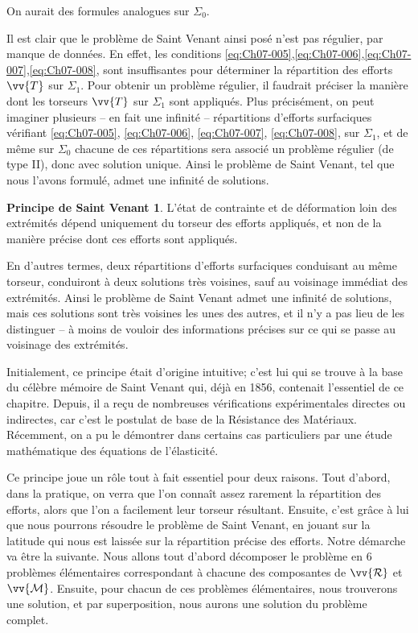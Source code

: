 On aurait des formules analogues sur $\Sigma_0$.

Il est clair que le problème de Saint Venant ainsi posé n'est pas régulier, par manque de données.
En effet, les conditions \eqref{eq:Ch07-005},\eqref{eq:Ch07-006},\eqref{eq:Ch07-007},\eqref{eq:Ch07-008}, sont insuffisantes pour déterminer la répartition des efforts $\vv{T}$ sur $\Sigma_1$.
Pour obtenir un problème régulier, il faudrait préciser la manière dont les torseurs $\vv{T}$ sur $\Sigma_1$ sont appliqués.
Plus précisément, on peut imaginer plusieurs --	en fait une infinité -- répartitions d'efforts surfaciques vérifiant \eqref{eq:Ch07-005}, \eqref{eq:Ch07-006}, \eqref{eq:Ch07-007}, \eqref{eq:Ch07-008}, sur $\Sigma_1$, et de même sur $\Sigma_0$ chacune de ces répartitions sera associé un problème régulier (de type II), donc avec solution unique.
Ainsi le problème de Saint Venant, tel que nous l'avons formulé, admet une infinité de solutions.

\theoremstyle{definition}
\newtheorem*{psv}{Principe de Saint Venant}
\begin{psv}
    L'état de contrainte et de déformation loin des extrémités dépend uniquement du torseur des efforts appliqués, et non de la manière précise dont ces efforts sont appliqués.
\end{psv}

En d'autres termes, deux répartitions d'efforts surfaciques conduisant au même torseur, conduiront à deux solutions très voisines, sauf au voisinage immédiat des extrémités.
Ainsi le problème de Saint Venant admet une infinité de solutions, mais ces solutions sont très voisines les unes des autres, et il n'y a pas lieu de les distinguer -- à moins de vouloir des informations précises sur ce qui se passe au voisinage des extrémités.

Initialement, ce principe était d'origine intuitive; c'est lui qui se trouve à la base du célèbre mémoire de Saint Venant qui, déjà en 1856, contenait l'essentiel de ce chapitre.
Depuis, il a reçu de nombreuses vérifications expérimentales directes ou indirectes, car c'est le postulat de base de la Résistance des Matériaux.
Récemment, on a pu le démontrer dans certains cas particuliers par une étude mathématique des équations de l'élasticité.

Ce principe joue un rôle tout à fait essentiel pour deux raisons.
Tout d'abord, dans la pratique, on verra que l'on connaît assez rarement la répartition des efforts, alors que l'on a facilement leur torseur résultant.
Ensuite, c'est grâce à lui que nous pourrons résoudre le problème de Saint Venant, en jouant sur la latitude qui nous est laissée sur la répartition précise des efforts.
Notre démarche va être la suivante.
Nous allons tout d'abord décomposer le problème en 6 problèmes élémentaires correspondant à chacune des composantes de $\vv{\mathcal{R}}$ et $\vv{\mathcal{M}}$.
Ensuite, pour chacun de ces problèmes élémentaires, nous trouverons une solution, et par superposition, nous aurons une solution du problème complet.

